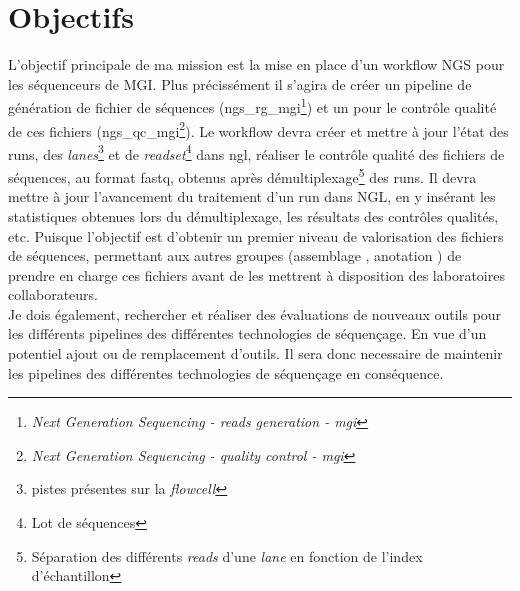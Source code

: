 \section{Objectifs}
L'objectif principale de ma mission est la mise en place d'un workflow NGS pour les séquenceurs de MGI. Plus précissément il s'agira de créer un pipeline de génération de fichier de séquences (ngs\_rg\_mgi\footnote{\emph{Next Generation Sequencing - reads generation - mgi}}) et un pour le contrôle qualité de ces fichiers (ngs\_qc\_mgi\footnote{\emph{Next Generation Sequencing - quality control - mgi}}). Le workflow devra créer et mettre à jour l'état des runs, des \emph{lanes}\footnote{pistes présentes sur la \emph{flowcell}} et de \emph{readset}\footnote{Lot de séquences} dans ngl, réaliser le contrôle qualité des fichiers de séquences, au format fastq, obtenus après démultiplexage\footnote{Séparation des différents \emph{reads} d'une \emph{lane} en fonction de l'index d'échantillon} des runs. Il devra mettre à jour l'avancement du traitement d'un run dans NGL, en y insérant les statistiques obtenues lors du démultiplexage, les résultats des contrôles qualités, etc. Puisque l'objectif est d'obtenir un premier niveau de valorisation des fichiers de séquences, permettant aux autres groupes (\og assemblage \fg{}, \og anotation \fg{}) de prendre en charge ces fichiers avant de les mettrent à disposition des laboratoires collaborateurs.\\

Je dois également, rechercher et réaliser des évaluations de nouveaux outils pour les différents pipelines des différentes technologies de séquençage. En vue d'un potentiel ajout ou de remplacement d'outils. Il sera donc necessaire de maintenir les pipelines des différentes technologies de séquençage en conséquence.